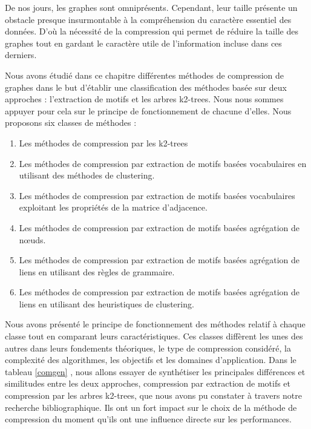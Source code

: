 De nos jours, les graphes sont omniprésents. Cependant, leur taille présente un obstacle presque insurmontable à la compréhension du caractère essentiel des données. D'où la nécessité de la compression qui permet de réduire la taille des graphes tout en gardant le caractère utile de l'information incluse dans ces derniers.

Nous avons étudié dans ce chapitre différentes méthodes de compression de graphes dans le but d'établir une classification des méthodes basée sur deux approches : l'extraction de motifs et les arbres k2-trees. Nous nous sommes appuyer pour cela sur le principe de fonctionnement de chacune d'elles. Nous  proposons six classes de méthodes :

\begin{enumerate}[label=\roman*]
\item  Les méthodes de compression par les k2-trees
	\item  Les méthodes de compression par extraction de motifs basées vocabulaires en utilisant des méthodes de clustering.
	\item  Les méthodes de compression par extraction de motifs basées vocabulaires exploitant les propriétés de la matrice d'adjacence.
	\item  Les méthodes de compression par extraction de motifs basées agrégation de nœuds.
	\item  Les méthodes de compression par extraction de motifs basées agrégation de liens en utilisant des règles de grammaire.
	\item  Les méthodes de compression par extraction de motifs basées agrégation de liens en utilisant des heuristiques de clustering.
\end{enumerate}
	
Nous avons présenté le principe de fonctionnement des méthodes relatif à chaque classe tout en comparant leurs caractéristiques. 
 Ces classes diffèrent les unes des autres dans leurs fondements théoriques, le type de compression considéré, la complexité des algorithmes, les objectifs et les domaines d'application. 
 Dans le tableau \ref{comgen} , nous allons essayer de synthétiser les principales différences et similitudes entre les deux approches, compression par extraction de motifs et compression par les arbres k2-trees, que nous avons pu constater à travers notre recherche bibliographique. Ils ont un fort impact sur le choix de la méthode de compression du moment qu'ils ont une influence directe sur les performances.
 
